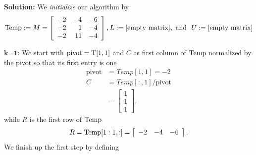\textbf{Solution:} We \textit{initialize} our algorithm by $${\rm Temp}:= M = \left[\begin{array}{rrr} -2 & -4 & -6\\
-2 & 1 & -4 \\ -2 & 11 & -4 \end{array}\right], L:=[\textrm{empty matrix}],~\text{and}~~ U:=[\textrm{empty matrix}]$$


$\textbf{k=1:}$ We start with $\rm pivot = T[1,1]$ and $C$ as first column of ${\rm Temp}$ normalized by the pivot so that its first entry is one
\begin{align*}
\textrm{pivot}&=Temp[1,1] = -2\\
C &= Temp[:,1] \slash\textrm{pivot} \\
&= \left[\begin{array}{r} 1 \\ 1 \\1 \end{array} \right],
\end{align*}
while $R$ is the first row of  ${\rm Temp}$ 
$$ R = {\rm Temp[1:1,:]}= \left[\begin{array}{rrr} -2&-4 & -6 \end{array} \right].$$
We finish up the first step by defining
